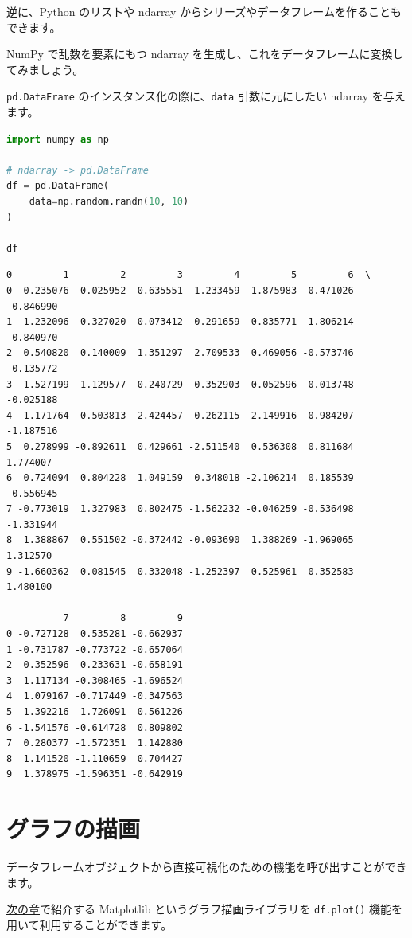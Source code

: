 逆に、Python のリストや ndarray からシリーズやデータフレームを作ることもできます。

NumPy で乱数を要素にもつ ndarray を生成し、これをデータフレームに変換してみましょう。


\texttt{pd.DataFrame} のインスタンス化の際に、\texttt{data} 引数に元にしたい ndarray を与えます。


\begin{lstlisting}[style=codecell,language=Python]
import numpy as np

# ndarray -> pd.DataFrame
df = pd.DataFrame(
    data=np.random.randn(10, 10)
)

df
\end{lstlisting}

\begin{lstlisting}[style=outputcell]
          0         1         2         3         4         5         6  \
0  0.235076 -0.025952  0.635551 -1.233459  1.875983  0.471026 -0.846990   
1  1.232096  0.327020  0.073412 -0.291659 -0.835771 -1.806214 -0.840970   
2  0.540820  0.140009  1.351297  2.709533  0.469056 -0.573746 -0.135772   
3  1.527199 -1.129577  0.240729 -0.352903 -0.052596 -0.013748 -0.025188   
4 -1.171764  0.503813  2.424457  0.262115  2.149916  0.984207 -1.187516   
5  0.278999 -0.892611  0.429661 -2.511540  0.536308  0.811684  1.774007   
6  0.724094  0.804228  1.049159  0.348018 -2.106214  0.185539 -0.556945   
7 -0.773019  1.327983  0.802475 -1.562232 -0.046259 -0.536498 -1.331944   
8  1.388867  0.551502 -0.372442 -0.093690  1.388269 -1.969065  1.312570   
9 -1.660362  0.081545  0.332048 -1.252397  0.525961  0.352583  1.480100   

          7         8         9  
0 -0.727128  0.535281 -0.662937  
1 -0.731787 -0.773722 -0.657064  
2  0.352596  0.233631 -0.658191  
3  1.117134 -0.308465 -1.696524  
4  1.079167 -0.717449 -0.347563  
5  1.392216  1.726091  0.561226  
6 -1.541576 -0.614728  0.809802  
7  0.280377 -1.572351  1.142880  
8  1.141520 -1.110659  0.704427  
9  1.378975 -1.596351 -0.642919  
\end{lstlisting}

\section{グラフの描画}


データフレームオブジェクトから直接可視化のための機能を呼び出すことができます。

\href{https://tutorials.chainer.org/ja/12_Introduction_to_Matplotlib.html}{次の章}で紹介する Matplotlib というグラフ描画ライブラリを \texttt{df.plot()} 機能を用いて利用することができます。


